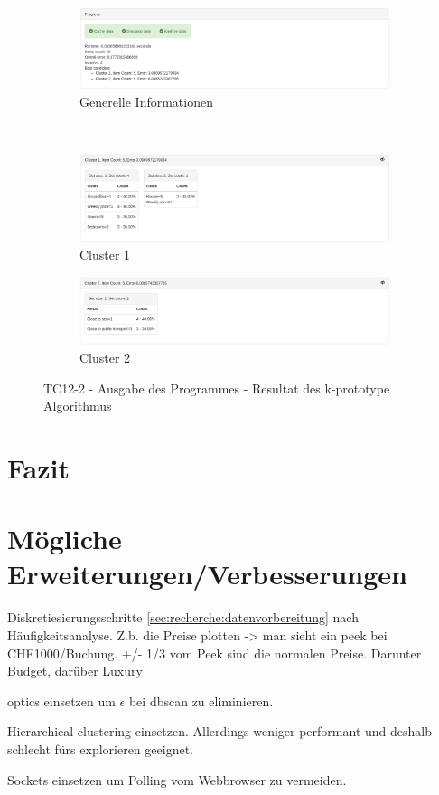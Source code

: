 \begin{figure}[H]
	\begin{subfigure}[t]{1\textwidth}
		\centering
		\includegraphics[width=1\textwidth]{images/tc12-kprototype-1}
		\caption{Generelle Informationen}
		\label{fig:testingfazit:testing:testcases:12-2-1}
	\end{subfigure} \\
	\begin{subfigure}[t]{1\textwidth}
		\centering
		\includegraphics[width=1\textwidth]{images/tc12-kprototype-2}
		\caption{Cluster 1}
		\label{fig:testingfazit:testing:testcases:12-2-2}
	\end{subfigure}
	\begin{subfigure}[t]{1\textwidth}
		\centering
		\includegraphics[width=1\textwidth]{images/tc12-kprototype-3}
		\caption{Cluster 2}
		\label{fig:testingfazit:testing:testcases:12-2-3}
	\end{subfigure}
	\caption{TC12-2 - Ausgabe des Programmes - Resultat des k-prototype Algorithmus}
	\label{fig:testingfazit:testing:testcases:12-2}
\end{figure}

\section{Fazit}

\section{Mögliche Erweiterungen/Verbesserungen}
Diskretiesierungsschritte \cref{sec:recherche:datenvorbereitung} nach Häufigkeitsanalyse.
Z.b. die Preise plotten -> man sieht ein peek bei CHF1000/Buchung. +/- 1/3 vom Peek sind die normalen Preise. Darunter Budget, darüber Luxury

\gls{optics} einsetzen um $\epsilon$ bei \gls{dbscan} zu eliminieren.

Hierarchical clustering einsetzen. Allerdings weniger performant und deshalb schlecht fürs explorieren geeignet.

Sockets einsetzen um Polling vom Webbrowser zu vermeiden.